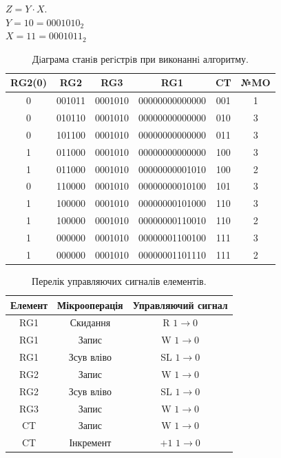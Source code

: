 \documentclass[a4paper, 10pt]{article}
\begin{document}
\noindent
$Z=Y\cdot X.$\\
$Y=10=0001010_{2}$\\
$X=11=0001011_{2}$\\
\begin{table}[h!]
\centering
\begin{tabular}{|cc|c|c|c|c|}
\hline
RG2(0) & RG2 & RG3 & RG1 & CT & №MO\\
\hline
0&001011&0001010&00000000000000&001&1\\
0&010110&0001010&00000000000000&010&3\\
0&101100&0001010&00000000000000&011&3\\
1&011000&0001010&00000000000000&100&3\\
1&011000&0001010&00000000001010&100&2\\
0&110000&0001010&00000000010100&101&3\\
1&100000&0001010&00000000101000&110&3\\
1&100000&0001010&00000000110010&110&2\\
1&000000&0001010&00000001100100&111&3\\
1&000000&0001010&00000001101110&111&2\\
\hline
\end{tabular}
\caption{Дiаграма станiв регiстрiв при виконаннi алгоритму.}
\end{table}

\begin{table}[h!]
\centering
\begin{tabular}{|c|c|c|}
\hline
Елемент & Мікрооперація & Управляючий сигнал\\
\hline
RG1 & Скидання   & R    $1\to0$ \\
RG1 & Запис      & W    $1\to0$ \\
RG1 & Зсув вліво & SL   $1\to0$ \\
\hline
RG2 & Запис      & W    $1\to0$ \\
RG2 & Зсув вліво & SL   $1\to0$ \\
\hline
RG3 & Запис      & W    $1\to0$ \\
\hline
CT  & Запис      & W    $1\to0$ \\
CT  & Інкремент  & $+1$ $1\to0$ \\
\hline
\end{tabular}
\caption{Перелік управляючих сигналів елементів.}
\end{table}
\end{document}
